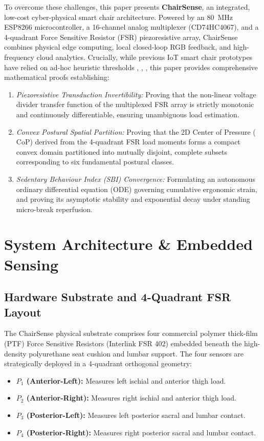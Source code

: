 \documentclass[conference]{IEEEtran}
\begin{document}
To overcome these challenges, this paper presents \textbf{ChairSense}, an integrated, low-cost cyber-physical smart chair architecture. Powered by an 80~MHz ESP8266 microcontroller, a 16-channel analog multiplexer (CD74HC4067), and a 4-quadrant Force Sensitive Resistor (FSR) piezoresistive array, ChairSense combines physical edge computing, local closed-loop RGB feedback, and high-frequency cloud analytics. Crucially, while previous IoT smart chair prototypes have relied on ad-hoc heuristic thresholds \cite{lee2022}, \cite{sodhi2016}, \cite{ganesh2017}, this paper provides comprehensive mathematical proofs establishing:
\begin{enumerate}
    \item \textit{Piezoresistive Transduction Invertibility:} Proving that the non-linear voltage divider transfer function of the multiplexed FSR array is strictly monotonic and continuously differentiable, ensuring unambiguous load estimation.
    \item \textit{Convex Postural Spatial Partition:} Proving that the 2D Center of Pressure ($\text{CoP}$) derived from the 4-quadrant FSR load moments forms a compact convex domain partitioned into mutually disjoint, complete subsets corresponding to six fundamental postural classes.
    \item \textit{Sedentary Behaviour Index (SBI) Convergence:} Formulating an autonomous ordinary differential equation (ODE) governing cumulative ergonomic strain, and proving its asymptotic stability and exponential decay under standing micro-break reperfusion.
\end{enumerate}

\section{System Architecture \& Embedded Sensing}

\subsection{Hardware Substrate and 4-Quadrant FSR Layout}
The ChairSense physical substrate comprises four commercial polymer thick-film (PTF) Force Sensitive Resistors (Interlink FSR 402) embedded beneath the high-density polyurethane seat cushion and lumbar support. The four sensors are strategically deployed in a 4-quadrant orthogonal geometry:
\begin{itemize}
    \item \textbf{$P_1$ (Anterior-Left):} Measures left ischial and anterior thigh load.
    \item \textbf{$P_2$ (Anterior-Right):} Measures right ischial and anterior thigh load.
    \item \textbf{$P_3$ (Posterior-Left):} Measures left posterior sacral and lumbar contact.
    \item \textbf{$P_4$ (Posterior-Right):} Measures right posterior sacral and lumbar contact.
\end{itemize}
\end{document}
